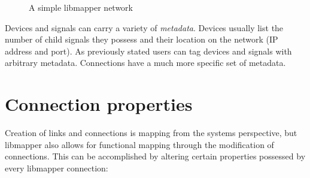 \begin{figure}[ht]
\centering
\caption{A simple libmapper network}
\label{fig:libmapper_devices}
\end{figure}

Devices and signals can carry a variety of \emph{metadata}. Devices usually list the number of child signals they possess and their location on the network (IP address and port). As previously stated users can tag devices and signals with arbitrary metadata. Connections have a much more specific set of metadata.


	\section{Connection properties} %
	\label{sec:connection_properties}

Creation of links and connections is mapping from the systems perspective, but libmapper also allows for functional mapping through the modification of connections. This can be accomplished by altering certain properties possessed by every libmapper connection:

